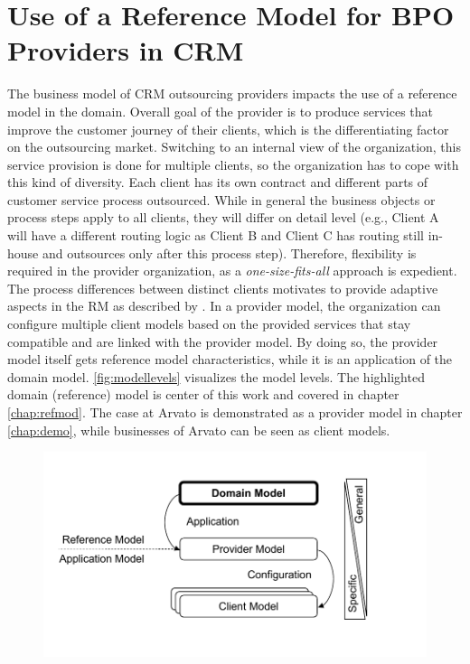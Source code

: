\section{Use of a Reference Model for BPO Providers in CRM}
\label{sec:refmodusearvato}
The business model of CRM outsourcing providers impacts the use of a reference model in the domain. Overall goal of the provider is to produce services that improve the customer journey of their clients, which is the differentiating factor on the outsourcing market. Switching to an internal view of the organization, this service provision is done for multiple clients, so the organization has to cope with this kind of diversity. Each client has its own contract and different parts of customer service process outsourced. While in general the business objects or process steps apply to all clients, they will differ on detail level (e.g., Client A will have a different routing logic as Client B and Client C has routing still in-house and outsources only after this process step). Therefore,  flexibility is required in the provider organization, as a \textit{one-size-fits-all} approach is expedient.
The process differences between distinct clients motivates to provide adaptive aspects in the \acrshort{RM} as described by \cite{delfmann2006adaptive}. In a provider model, the organization can configure multiple client models based on the provided services that stay compatible and are linked with the provider model. By doing so, the provider model itself gets reference model characteristics, while it is an application of the domain model. \Fig \ref{fig:modellevels} visualizes the model levels. The highlighted domain (reference) model is center of this work and covered in chapter \ref{chap:refmod}. The case at Arvato is demonstrated as a provider model in chapter \ref{chap:demo}, while businesses of Arvato can be seen as client models. 

\begin{figure}[caption={Model Levels}, label={fig:modellevels}]
	{	\includegraphics[width=.8\textwidth]{figures/refmodlevels.pdf}}
\end{figure}

